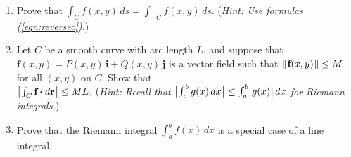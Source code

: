 \begin{enumerate}[\bfseries 1.]
  a smooth curve $C$, then $\int_C \Dotprod{\textbf{f}}{d\textbf{r}} = \int_C \norm{\textbf{f}}\,ds$.
[{[\bfseries 1.]}]
 \item Prove that $\int_C f(x,y)\,ds = \int_{-C} f(x,y)\,ds$. (\emph{Hint: Use formulas (\ref{eqn:reversec}).})
 \item Let $C$ be a smooth curve with arc length $L$, and suppose that $\textbf{f}(x,y) = P(x,y)\,\textbf{i} +
  Q(x,y)\,\textbf{j}$ is a vector field such that $\lVert\mspace{1mu}\textbf{f}(x,y)\mspace{1mu}\rVert \le M$ for all $(x,y)$ on $C$. Show
  that\\$\bigl\lvert\mspace{1mu}\int_C \textbf{f} \bm{\cdot} d\textbf{r}\mspace{1mu}\bigr\rvert \le ML$.
  (\emph{Hint: Recall that $\bigl\lvert\mspace{1mu}\int_a^b g(x)\,dx\mspace{1mu}\bigr\rvert \le \int_a^b \lvert\mspace{1mu}g(x)\mspace{1mu}\rvert\,dx$ for Riemann integrals.})
 \item Prove that the Riemann integral $\int_a^b f(x)\,dx$ is a special case of a line integral.
\end{enumerate}
\newpage
